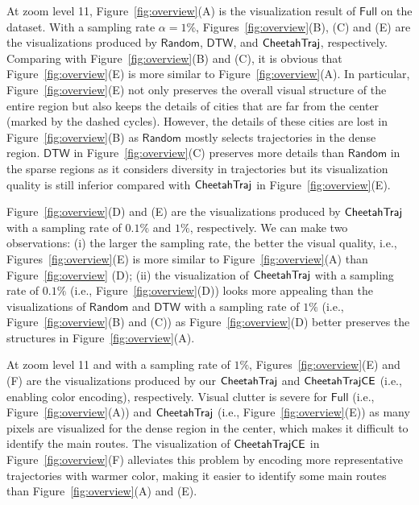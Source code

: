 At zoom level 11, Figure~\ref{fig:overview}(A) is the visualization result of $\mathsf{Full}$ on the \pt{} dataset.
With a sampling rate $\alpha \!=\! 1\%$, Figures~\ref{fig:overview}(B), (C) and (E) are the visualizations produced by $\mathsf{Random}$, $\mathsf{DTW}$,
and $\mathsf{CheetahTraj}$, respectively. Comparing with Figure~\ref{fig:overview}(B) and (C), it is obvious that Figure~\ref{fig:overview}(E) is more similar to Figure~\ref{fig:overview}(A). In particular, Figure~\ref{fig:overview}(E) not only preserves the overall visual structure of the entire region but also keeps the details of cities that are far from the center (marked by the dashed cycles). However, the details of these cities are lost in Figure~\ref{fig:overview}(B) as $\mathsf{Random}$ mostly selects trajectories in the dense region. $\mathsf{DTW}$ in Figure~\ref{fig:overview}(C) preserves more details than $\mathsf{Random}$ in the sparse regions as it considers diversity in trajectories but its visualization quality is still inferior compared with $\mathsf{CheetahTraj}$ in Figure~\ref{fig:overview}(E).

Figure~\ref{fig:overview}(D) and (E) are the visualizations produced by $\mathsf{CheetahTraj}{}$ with a sampling rate of $0.1\%$ and $1\%$, respectively. We can make two observations: (i) the larger the sampling rate, the better the visual quality, i.e., Figures~\ref{fig:overview}(E) is more similar to Figure~\ref{fig:overview}(A) than Figure~\ref{fig:overview} (D); (ii) the visualization of $\mathsf{CheetahTraj}$ with a sampling rate of $0.1\%$ (i.e., Figure~\ref{fig:overview}(D)) looks more appealing than the visualizations of $\mathsf{Random}$ and $\mathsf{DTW}$ with a sampling rate of $1\%$ (i.e., Figure~\ref{fig:overview}(B) and (C)) as Figure~\ref{fig:overview}(D) better preserves the structures in Figure~\ref{fig:overview}(A).



 At zoom level 11 and with a sampling rate of $1\%$, Figures~\ref{fig:overview}(E) and (F) are the visualizations produced by our $\mathsf{CheetahTraj}$ and $\mathsf{CheetahTraj}\mathsf{CE}$ (i.e., enabling color encoding), respectively.
Visual clutter is severe for $\mathsf{Full}$ (i.e., Figure~\ref{fig:overview}(A)) and $\mathsf{CheetahTraj}$ (i.e., Figure~\ref{fig:overview}(E)) as many pixels are visualized for the dense region in the center, which makes it difficult to identify the main routes. The visualization of $\mathsf{CheetahTraj}\mathsf{CE}$ in Figure~\ref{fig:overview}(F) alleviates this problem by encoding more representative trajectories with warmer color, making it easier to identify some main routes than Figure~\ref{fig:overview}(A) and (E).

